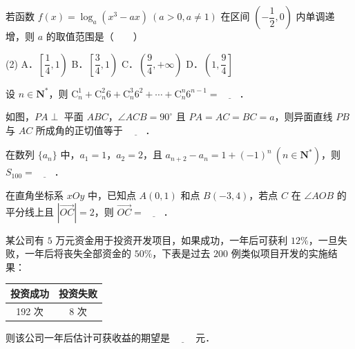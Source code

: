 \begin{question}
若函数 $f(x) = \log_a(x^3 - ax)\ (a > 0, a \neq 1)$ 在区间 $\left(-\dfrac{1}{2}, 0\right)$ 内单调递增，则 $a$ 的取值范围是\mbox{（　　）}

\begin{gkopts}(2)
\task A．$\left[\dfrac{1}{4}, 1\right)$
\task B．$\left[\dfrac{3}{4}, 1\right)$
\task C．$\left(\dfrac{9}{4}, +\infty\right)$
\task D．$\left(1, \dfrac{9}{4}\right]$
\end{gkopts}

\end{question}

\begin{question}
设 $n \in \mathbf{N}^*$，则 $\mathrm{C}_n^1 + \mathrm{C}_n^2 6 + \mathrm{C}_n^3 6^2 + \cdots + \mathrm{C}_n^n 6^{n-1} = \underline{\hspace{2em}}$．

\Needspace{0.4\textheight}
\end{question}
\begin{question}
如图，$PA \perp$ 平面 $ABC$，$\angle ACB = 90^\circ$ 且 $PA = AC = BC = a$，则异面直线 $PB$ 与 $AC$ 所成角的正切值等于 $\underline{\hspace{2em}}$．
\nopagebreak[4]
\begin{center}\end{center}
\nopagebreak[4]
\end{question}
\begin{question}
在数列 $\{a_n\}$ 中，$a_1 = 1$，$a_2 = 2$，且 $a_{n+2} - a_n = 1 + (-1)^n\ (n \in \mathbf{N}^*)$，则 $S_{100} = \underline{\hspace{2em}}$．

\end{question}
\begin{question}
在直角坐标系 $xOy$ 中，已知点 $A(0, 1)$ 和点 $B(-3, 4)$，若点 $C$ 在 $\angle AOB$ 的平分线上且 $|\vec{OC}| = 2$，则 $\vec{OC} = \underline{\hspace{2em}}$．

\end{question}
\begin{question}
某公司有 $5$ 万元资金用于投资开发项目，如果成功，一年后可获利 $12\%$，一旦失败，一年后将丧失全部资金的 $50\%$，下表是过去 $200$ 例类似项目开发的实施结果：

\begin{center}
\begin{tabular}{cc}
\toprule
投资成功 & 投资失败 \\
\midrule
192 次 & 8 次 \\
\bottomrule
\end{tabular}
\end{center}

则该公司一年后估计可获收益的期望是 $\underline{\hspace{2em}}$ 元．

\end{question}
